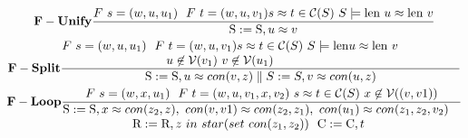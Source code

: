 \begin{gather*}\label{eA1}
 \bold{F-Unify} \frac
 { F \ s = ( w,u,u_1) \ \ F \ t = (w, u,v_1)  s\approx t \in \mathcal{C}(S) \ S \models \textnormal{len} \ u \approx \textnormal{len} \ v }
 { \textnormal{S}:= \textnormal{S}, u \approx v}\\
  \bold{F-Split} \frac
  {\parbox{4.5in}{$  F \ s = ( w,u,u_1) \ \ F \ t = (w, u,v_1)  s\approx t \in \mathcal{C}(S) \ S \models \textnormal{len} u \approx \textnormal{len} \ v  $ \\
       \hspace*{3.0cm}$ u \not\in \mathcal{V}(v_1) \ v \not\in \mathcal{V}(u_1)$}}
  { \textnormal{S}:= \textnormal{S}, u \approx con(v, z) \parallel  S:= S, v \approx con(u, z) }\\
  \bold{F-Loop} \frac
  { F \ s = ( w,x,u_1) \ \ F \ t = (w, u,v_1, x, v_2)  \ s\approx t \in \mathcal{C}(S) \ x \not\in \mathcal{V}((v,v1))}
  { \parbox{4.5in}{$ \textnormal{S}:= \textnormal{S}, x \approx con(z_2, z),\ con(v,v1) \approx con(z_2,z_1),\ con(u_1) \approx con( z_1, z_2,v_2)$ \\
   \hspace*{2.0cm}$  \textnormal{R}:=\textnormal{R}, z \ in \ star(set \ con(z_1, z_2)) \ \ \textnormal{C}:=\textnormal{C}, t $}}
\end{gather*}
